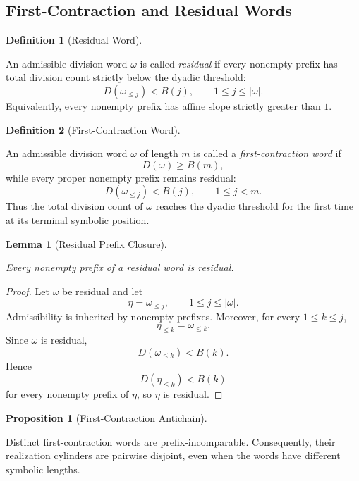 \documentclass[12pt, oneside]{article}
\numberwithin{equation}{section}
\theoremstyle{definition}
\newtheorem{definition}{Definition}[section]
\newtheorem{proposition}{Proposition}[section]
\theoremstyle{plain}
\newtheorem{lemma}[theorem]{Lemma}
\theoremstyle{remark}
\begin{document}
\subsection{First-Contraction and Residual Words}

\begin{definition}[Residual Word]
\label{def:residual-word}

An admissible division word \(\omega\) is called \emph{residual} if every
nonempty prefix has total division count strictly below the dyadic threshold:
\[
D(\omega_{\le j})<B(j),
\qquad
1\le j\le|\omega|.
\]
Equivalently, every nonempty prefix has affine slope strictly greater than
\(1\).
\end{definition}

\begin{definition}[First-Contraction Word]
\label{def:first-contraction-word}

An admissible division word \(\omega\) of length \(m\) is called a
\emph{first-contraction word} if
\[
D(\omega)\ge B(m),
\]
while every proper nonempty prefix remains residual:
\[
D(\omega_{\le j})<B(j),
\qquad
1\le j<m.
\]
Thus the total division count of \(\omega\) reaches the dyadic threshold for
the first time at its terminal symbolic position.
\end{definition}

\begin{lemma}[Residual Prefix Closure]
\label{lem:residual-prefix-closure}

Every nonempty prefix of a residual word is residual.
\end{lemma}

\begin{proof}
Let \(\omega\) be residual and let
\[
\eta=\omega_{\le j},
\qquad
1\le j\le|\omega|.
\]
Admissibility is inherited by nonempty prefixes. Moreover, for every
\(1\le k\le j\),
\[
\eta_{\le k}=\omega_{\le k}.
\]
Since \(\omega\) is residual,
\[
D(\omega_{\le k})<B(k).
\]
Hence
\[
D(\eta_{\le k})<B(k)
\]
for every nonempty prefix of \(\eta\), so \(\eta\) is residual.
\end{proof}

\begin{proposition}[First-Contraction Antichain]
\label{prop:first-contraction-antichain}

Distinct first-contraction words are prefix-incomparable. Consequently,
their realization cylinders are pairwise disjoint, even when the words have
different symbolic lengths.
\end{proposition}
\end{document}
